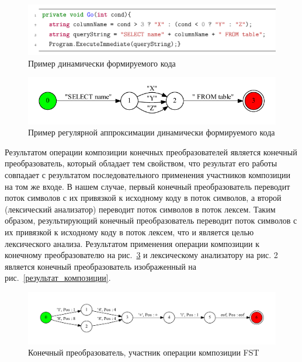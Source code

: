 \documentclass[14pt]{matmex-diploma}
\begin{document}
\begin{figure}[h]
\centering
\includegraphics{pictures/approx_code.pdf}
\caption{Пример динамически формируемого кода}
\label{пример_кода_2}
\end{figure}

\begin{figure}[h]
\centering
\includegraphics{pictures/approx_fsa.pdf}
\caption{Пример регулярной аппроксимации динамически формируемого кода}
\label{пример_регулярной_аппроксимации}
\end{figure}

Результатом операции композиции конечных преобразователей является конечный преобразователь, который обладает тем свойством, что результат его работы совпадает с результатом последовательного применения участников композиции на том же входе. В нашем случае, первый конечный преобразователь переводит поток символов с их привязкой к исходному коду в поток символов, а второй (лексический анализатор) переводит поток символов в поток лексем. Таким образом, результирующий конечный преобразователь переводит поток символов с их привязкой к исходному коду в поток лексем, что и является целью лексического анализа. Результатом применения операции композиции к конечному преобразователю на рис.~\ref{участник_композиции} и лексическому анализатору на рис. 2 является конечный преобразователь изображенный на рис.~\ref{результат_композиции}.

\begin{figure}[h]
\centering
\includegraphics[width=16cm]{pictures/example.pdf}
\caption{Конечный преобразователь, участник операции композиции FST}
\label{участник_композиции}
\end{figure}
\end{document}
